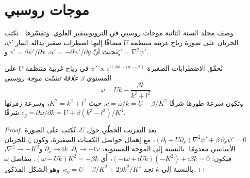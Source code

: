 \section{موجات روسبي}\label{sec:b3:atmospheric-dynamics:rossby}

وصف مجلد السنة الثانية موجات روسبي في التروبوسفير العلوي. وتفسّرها
. نكتب الجريان على صورة رياح غربية منتظمة
$U$ مضافًا إليها اضطراب صغير بدالة التيار $\psi'$، بحيث أنّ
$u' = -\partial\psi'/\partial y$، $v' = \partial\psi'/\partial x$ و$\zeta'
= \nabla^2\psi'$.

\begin{theorem}\label{thm:b3:atmospheric-dynamics:rossby}
تُحقّق الاضطرابات الصغيرة $\psi' \propto \mathrm e^{\mathrm i(kx + ly - \omega t)}$
في رياح غربية منتظمة $U$ على المستوي $\beta$
\emph{علاقةَ تشتّت موجة روسبي}
\[
\omega = Uk - \frac{\beta k}{k^2 + l^2} .
\]
وتكون سرعة طورها شرقًا $c = \omega/k = U - \beta/K^2$، حيث $K^2 =
k^2 + l^2$، وسرعة زمرتها شرقًا $c_g = \partial\omega/\partial
k = U + \beta(k^2 - l^2)/K^4$.
\end{theorem}

\begin{proof}
بعد التقريب الخطّي حول $U$، تُكتب  على الصورة
$(\partial_t + U\partial_x)\nabla^2\psi' + \beta\,\partial_x\psi' = 0$، مع إهمال
حواصل الكميات الصغيرة، وكون $\zeta$ للجريان الأساسي معدومًا.
بالنسبة إلى الموجة المستوية، $\partial_t \to -\mathrm i\omega$،
$\partial_x \to \mathrm ik$ و$\nabla^2 \to -K^2$، فيكون: $(-\mathrm i\omega +
\mathrm iUk)(-K^2) + \mathrm i\beta k = 0$، أي $(\omega - Uk)K^2 =
-\beta k$. بتفاضل $\omega$ بالنسبة إلى $k$ نجد $c_g = U -
\beta/K^2 + 2\beta k^2/K^4$، وهو الشكل المذكور.
\end{proof}

